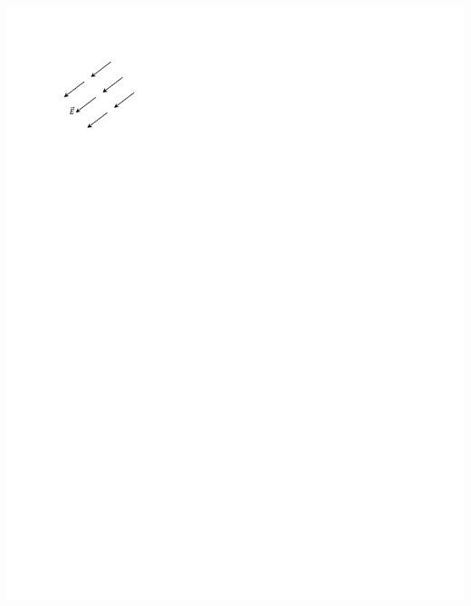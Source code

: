 \begin{enumerate}[labparts]
\begin{center}
\vspace{-0.25 in}
\includegraphics{potential_intro/activity_5_figs/uniform_E_field_2_squish.pdf}
\end{center}


\end{enumerate}
